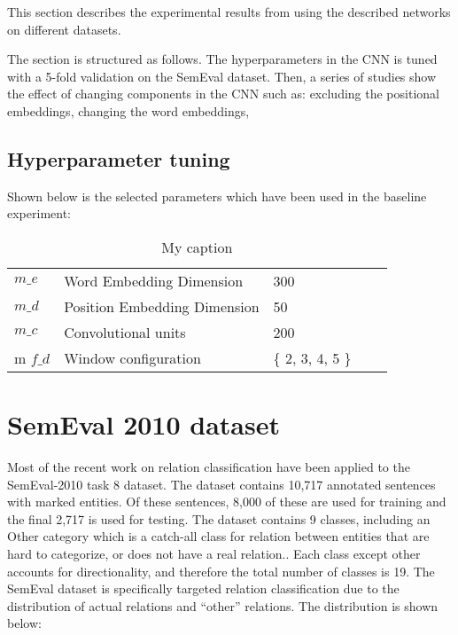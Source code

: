 








This section describes the experimental results from using the described networks on different datasets.

The section is structured as follows. The hyperparameters in the CNN is tuned with a 5-fold validation on the SemEval dataset. Then, a series of studies show the effect of changing components in the CNN such as: excluding the positional embeddings, changing the word embeddings,  

\subsection{Hyperparameter tuning}

Shown below is the selected parameters which have been used in the baseline experiment:

\begin{table}[]
\centering
\caption{My caption}
\label{my-label}
\begin{tabular}{lllll}
$m\_e$ & Word Embedding Dimension     & 300              &  &  \\
$m\_d$ & Position Embedding Dimension & 50               &  &  \\
$m\_c$ & Convolutional units          & 200              &  &  \\
m
$f\_d$ & Window configuration         & \{ 2, 3, 4, 5 \} &  &  \\

\end{tabular}
\end{table}

\section{SemEval 2010 dataset}
Most of the recent work on relation classification have been applied to the SemEval-2010 task 8 dataset. The dataset contains 10,717 annotated sentences with marked entities. Of these sentences, 8,000 of these are used for training and the final 2,717 is used for testing. The dataset contains 9 classes, including an Other category which is a catch-all class for relation between entities that are hard to categorize, or does not have a real relation.. Each class except other accounts for directionality, and therefore the total number of classes is 19. The SemEval dataset is specifically targeted relation classification due to the distribution of actual relations and ``other'' relations. The distribution is shown below:

